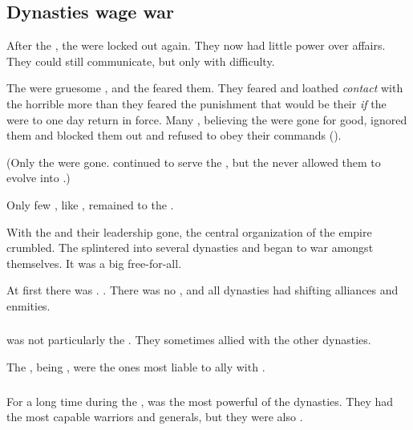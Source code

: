 \subsection{Dynasties wage war}
After the , the \banelords{} were locked out again. 
They now had little power over \Miithian{} affairs. 
They could still communicate, but only with difficulty. 

The \banelords{} were gruesome , and the \resphain{} feared them. 
They feared and loathed \emph{contact} with the horrible \banes{} more than they feared the punishment that would be their \emph{if} the \banes{} were to one day return in force. 
Many \resphain, believing the \banelords{} were gone for good, ignored them and blocked them out and refused to obey their commands (). 

(Only the \banelords{} were gone. 
\Lesserbanes{} continued to serve the \resphain, but the \resphain{} never allowed them to evolve into \banelords.) 

Only few \resphain, like , remained  to the \banelords. 

With the \banes{} and their leadership gone, the central organization of the \resphan{} empire crumbled.
The \resphain{} splintered into several dynasties and began to war amongst themselves. 
It was a big free-for-all. 

At first there was . 
. 
There was no , and all dynasties had shifting alliances and enmities. 





\subsubsection{\Kezerad}
\Kezerad was not particularly the . 
They sometimes allied with the other dynasties. 

The \TiphredSerah{}, being , were the ones most liable to ally with \Kezerad. 





\subsubsection{\Mystraacht}
For a long time during the \resphanwars, \Mystraacht{} was the most powerful of the dynasties. 
They had the most capable warriors and generals, but they were also . 

